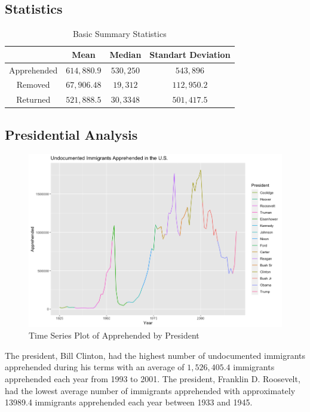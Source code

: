 \documentclass[a4paper]{article}
\begin{document}
\subsection{Statistics}
\begin{table}[h!]
    \centering
    \caption{Basic Summary Statistics}
    \begin{tabular}{|c|c|c|c|}
    \hline
    & Mean & Median & Standart Deviation \\
    \hline
    Apprehended & $614,880.9$ & $530,250$ & $543,896$ \\ 
    \hline
    Removed & $67,906.48$ & $19,312$ & $112,950.2$ \\
    \hline
    Returned & $521,888.5$ & $30,3348$ & $501,417.5$ \\ 
    \hline
    \end{tabular}
    \label{tab:lambda}
\end{table}

\subsection{Presidential Analysis}


\begin{figure}[h!]
\centering
\includegraphics[scale=0.3]{images/presapp.png}
\caption{Time Series Plot of Apprehended by President}
\label{fig:pres_app}
\end{figure}

The  president, Bill Clinton, had the highest number of undocumented immigrants apprehended during his terms with an average of $1,526,405.4$ immigrants apprehended each year from 1993 to 2001. The  president, Franklin D. Roosevelt, had the lowest average number of immigrants apprehended with approximately 13989.4 immigrants apprehended each year between 1933 and 1945. \\
\end{document}
